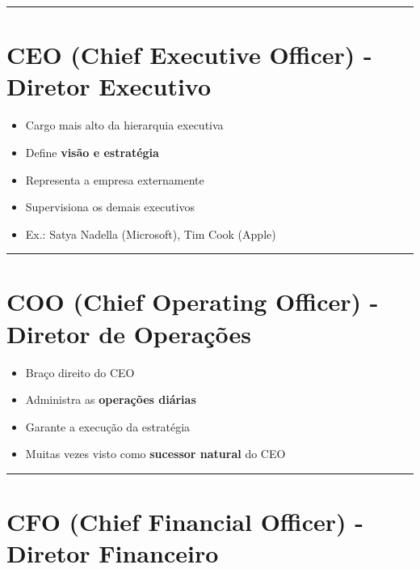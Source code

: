 \documentclass[
]{book}
\providecommand{\tightlist}{%
  \setlength{\itemsep}{0pt}\setlength{\parskip}{0pt}}
\begin{document}
\begin{center}\rule{0.5\linewidth}{0.5pt}\end{center}

\section{CEO (Chief Executive Officer) - Diretor Executivo}\label{ceo-chief-executive-officer---diretor-executivo}

\begin{itemize}
\tightlist
\item
  Cargo mais alto da hierarquia executiva
\item
  Define \textbf{visão e estratégia}
\item
  Representa a empresa externamente
\item
  Supervisiona os demais executivos
\item
  Ex.: Satya Nadella (Microsoft), Tim Cook (Apple)
\end{itemize}

\begin{center}\rule{0.5\linewidth}{0.5pt}\end{center}

\section{COO (Chief Operating Officer) - Diretor de Operações}\label{coo-chief-operating-officer---diretor-de-operauxe7uxf5es}

\begin{itemize}
\tightlist
\item
  Braço direito do CEO
\item
  Administra as \textbf{operações diárias}
\item
  Garante a execução da estratégia
\item
  Muitas vezes visto como \textbf{sucessor natural} do CEO
\end{itemize}

\begin{center}\rule{0.5\linewidth}{0.5pt}\end{center}

\section{CFO (Chief Financial Officer) - Diretor Financeiro}\label{cfo-chief-financial-officer---diretor-financeiro}
\end{document}
